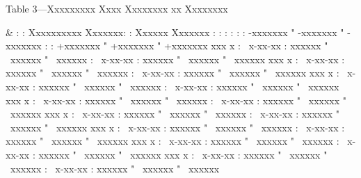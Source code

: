 \medskip\bigbreak
\midinsert
\centerline{Table 3---Xxxxxxxxx Xxxx Xxxxxxxx xx Xxxxxxxx}
\smallbreak
\line \bgroup \hss
  \begintable
  \begintableformat
     & \center
  \endtableformat
  \-
  \br{\::}  :          :  Xxxxxxxxxx Xxxxxxx:
                       :  Xxxxxx Xxxxxxx     \er{:}
  \br{\:}   :  :  \-
                       :  :  \-     \er{:}
  \br{\::}   :  : -xxxxxxx " -xxxxxxx " -xxxxxxx :
                : +xxxxxxx " +xxxxxxx " +xxxxxxx \er{:}
  \-
  \br{\::} {xxx x} : ~x-xx-xx : xxxxxx " ~xxxxxx " ~xxxxxx
                   : ~x-xx-xx : xxxxxx " ~xxxxxx " ~xxxxxx \er{:}
  \-
  \br{\::} {xxx x} : ~x-xx-xx : xxxxxx " ~xxxxxx " ~xxxxxx
                   : ~x-xx-xx : xxxxxx " ~xxxxxx " ~xxxxxx \er{:}
  \-
  \br{\::} {xxx x} : ~x-xx-xx : xxxxxx " ~xxxxxx " ~xxxxxx
                   : ~x-xx-xx : xxxxxx " ~xxxxxx " ~xxxxxx \er{:}
  \-
  \br{\::} {xxx x} : ~x-xx-xx : xxxxxx " ~xxxxxx " ~xxxxxx
                   : ~x-xx-xx : xxxxxx " ~xxxxxx " ~xxxxxx \er{:}
  \-
  \br{\::} {xxx x} : ~x-xx-xx : xxxxxx " ~xxxxxx " ~xxxxxx
                   : ~x-xx-xx : xxxxxx " ~xxxxxx " ~xxxxxx \er{:}
  \-
  \br{\::} {xxx x} : ~x-xx-xx : xxxxxx " ~xxxxxx " ~xxxxxx
                   : ~x-xx-xx : xxxxxx " ~xxxxxx " ~xxxxxx \er{:}
  \-
  \br{\::} {xxx x} : ~x-xx-xx : xxxxxx " ~xxxxxx " ~xxxxxx
                   : ~x-xx-xx : xxxxxx " ~xxxxxx " ~xxxxxx \er{:}
  \-
  \br{\::} {xxx x} : ~x-xx-xx : xxxxxx " ~xxxxxx " ~xxxxxx
                   : ~x-xx-xx : xxxxxx " ~xxxxxx " ~xxxxxx \er{:}
  \-
  \endtable
\hss \egroup
\endinsert

\bye
